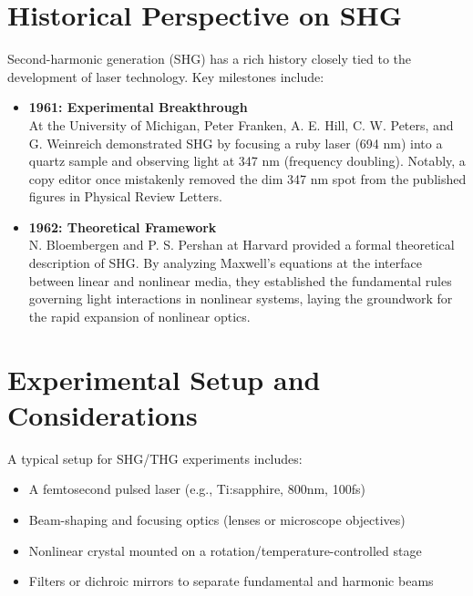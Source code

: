 \documentclass[9pt,a4paper,twocolumn,twoside]{tau-class/tau}
\begin{document}

\section{Historical Perspective on SHG}
Second-harmonic generation (SHG) has a rich history closely tied to the development of laser technology. Key milestones include:

\begin{itemize}
    \item \textbf{1961: Experimental Breakthrough} \\
    At the University of Michigan, Peter Franken, A. E. Hill, C. W. Peters, and G. Weinreich demonstrated SHG by focusing a ruby laser (694 nm) into a quartz sample and observing light at 347 nm (frequency doubling). Notably, a copy editor once mistakenly removed the dim 347 nm spot from the published figures in Physical Review Letters.
    
    \item \textbf{1962: Theoretical Framework} \\
    N. Bloembergen and P. S. Pershan at Harvard provided a formal theoretical description of SHG. By analyzing Maxwell's equations at the interface between linear and nonlinear media, they established the fundamental rules governing light interactions in nonlinear systems, laying the groundwork for the rapid expansion of nonlinear optics.
\end{itemize}

\section{Experimental Setup and Considerations}
A typical setup for SHG/THG experiments includes:
\begin{itemize}
\item A femtosecond pulsed laser (e.g., Ti:sapphire, 800nm, 100fs)
\item Beam-shaping and focusing optics (lenses or microscope objectives)
\item Nonlinear crystal mounted on a rotation/temperature-controlled stage
\item Filters or dichroic mirrors to separate fundamental and harmonic beams
\end{itemize}
\end{document}
